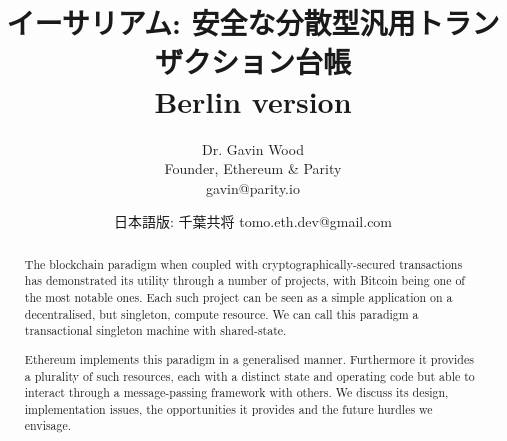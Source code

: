 \documentclass[9pt,oneside]{amsart}
\title[イーサリアム: 安全な分散型汎用トランザクション台帳\\ \smaller \textbf{{Berlin version}}]{イーサリアム: 安全な分散型汎用トランザクション台帳\\ \smaller \textbf{{Berlin version \YellowPaperVersionNumber}}}
\author{
    Dr. Gavin Wood\\
    Founder, Ethereum \& Parity\\
    gavin@parity.io\\
}
\author{
    日本語版: 千葉共将
    tomo.eth.dev@gmail.com
}
\begin{document}
\pagecolor{pagecolor}

\begin{abstract}
The blockchain paradigm when coupled with cryptographically-secured transactions has demonstrated its utility through a number of projects, with Bitcoin being one of the most notable ones. Each such project can be seen as a simple application on a decentralised, but singleton, compute resource. We can call this paradigm a transactional singleton machine with shared-state.

Ethereum implements this paradigm in a generalised manner. Furthermore it provides a plurality of such resources, each with a distinct state and operating code but able to interact through a message-passing framework with others. We discuss its design, implementation issues, the opportunities it provides and the future hurdles we envisage.
\end{abstract}

\maketitle
\end{document}
